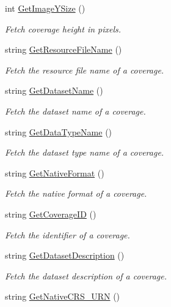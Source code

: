 \begin{DoxyCompactItemize}
int \hyperlink{classAbstractDataset_a4f7ceb09ad968d28a5282c7652fb6975}{GetImageYSize} ()
\begin{DoxyCompactList}\small\item\em Fetch coverage height in pixels. \end{DoxyCompactList}\item 
string \hyperlink{classAbstractDataset_ab7b76c03b2a94853b631b83ebb1be453}{GetResourceFileName} ()
\begin{DoxyCompactList}\small\item\em Fetch the resource file name of a coverage. \end{DoxyCompactList}\item 
string \hyperlink{classAbstractDataset_a93b5fa34e8ace1dd9c30abad1f3e2f72}{GetDatasetName} ()
\begin{DoxyCompactList}\small\item\em Fetch the dataset name of a coverage. \end{DoxyCompactList}\item 
string \hyperlink{classAbstractDataset_a5a6c03e8c1f796ef1ffd018016b342fa}{GetDataTypeName} ()
\begin{DoxyCompactList}\small\item\em Fetch the dataset type name of a coverage. \end{DoxyCompactList}\item 
string \hyperlink{classAbstractDataset_a9c37d346022864bf92f5d9d33e45fd42}{GetNativeFormat} ()
\begin{DoxyCompactList}\small\item\em Fetch the native format of a coverage. \end{DoxyCompactList}\item 
string \hyperlink{classAbstractDataset_a6d91e0d5d812e4a9b796796cb8fc45a3}{GetCoverageID} ()
\begin{DoxyCompactList}\small\item\em Fetch the identifier of a coverage. \end{DoxyCompactList}\item 
string \hyperlink{classAbstractDataset_ace176d7bf4a12ae58e48ded2da210a86}{GetDatasetDescription} ()
\begin{DoxyCompactList}\small\item\em Fetch the dataset description of a coverage. \end{DoxyCompactList}\item 
string \hyperlink{classAbstractDataset_ab4509cea5f99f8ebeb836d85828c3470}{GetNativeCRS\_\-URN} ()

\end{DoxyCompactItemize}
